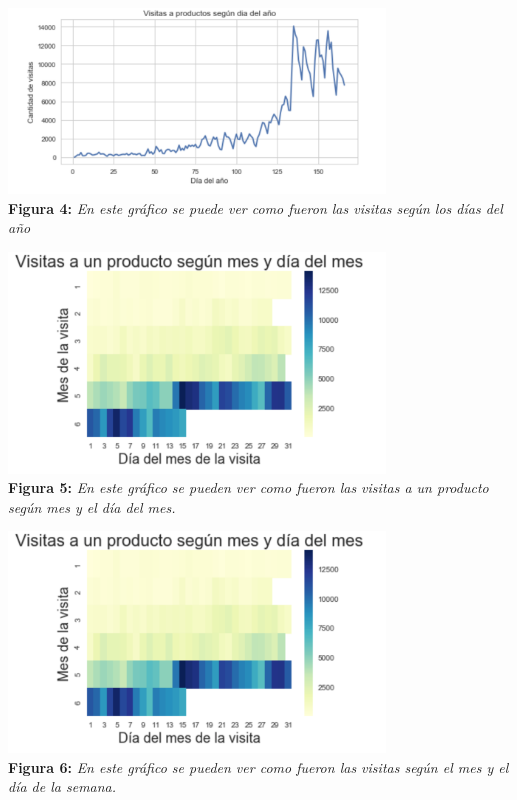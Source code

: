 \documentclass[titlepage,a4paper]{article}
\begin{document}
	\begin{center}
	\includegraphics[width=10cm]{VisitasAProductosSegunDiaAnio.jpg}\\
	\textbf{Figura 4:}  \textit{En este gráfico se puede ver como fueron las visitas según los días del año  }
	\end{center}

	\begin{center}
	\includegraphics[width=10cm]{visitasSegunmesDiaMes.jpg}\\
	\textbf{Figura 5:}  \textit{En este gráfico se pueden ver como fueron las visitas a un producto según mes y el día del mes.   }
	
	\end{center}
	\begin{center}
	\includegraphics[width=10cm]{visitasSegunmesDiaSemana.jpg}\\
	\textbf{Figura 6:}  \textit{En este gráfico se pueden ver como fueron las visitas según el mes y el día de la semana.    }
	\end{center}
	
\end{document}
